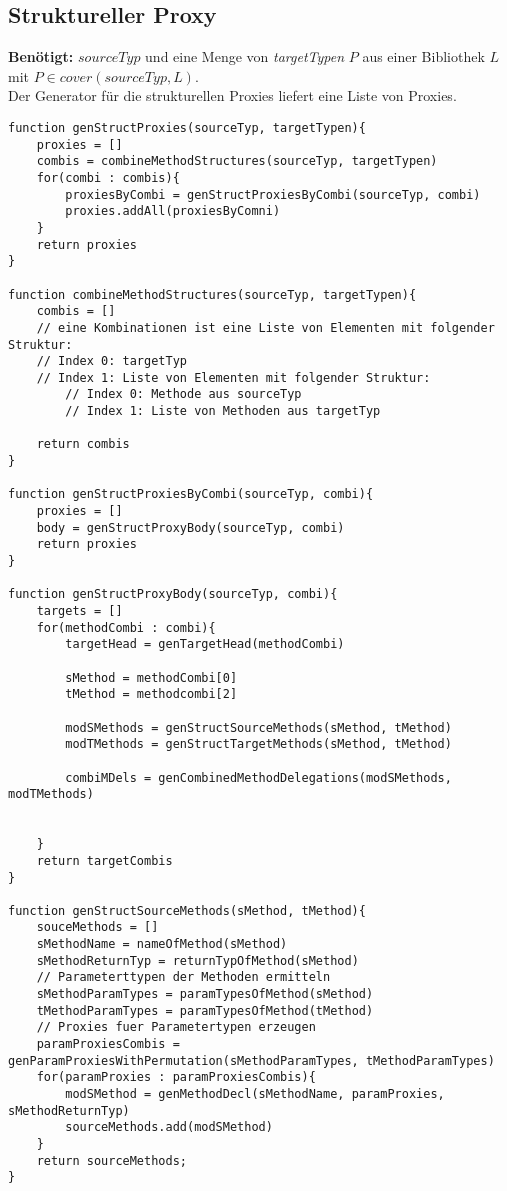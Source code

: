 \documentclass[a4paper,12pt]{article}
\begin{document}
\subsection{Struktureller Proxy}
\textbf{Benötigt: }$sourceTyp$ und eine Menge von \emph{targetTypen} $P$ aus einer Bibliothek $L$ mit $P \in \mathit{cover(sourceTyp, L)}$.\\
Der Generator für die strukturellen Proxies liefert eine Liste von Proxies.
\begin{lstlisting}[style = generator]
function genStructProxies(sourceTyp, targetTypen){
	proxies = []
	combis = combineMethodStructures(sourceTyp, targetTypen)
	for(combi : combis){
		proxiesByCombi = genStructProxiesByCombi(sourceTyp, combi)
		proxies.addAll(proxiesByComni)
	}
	return proxies
}

function combineMethodStructures(sourceTyp, targetTypen){
	combis = []
	// eine Kombinationen ist eine Liste von Elementen mit folgender Struktur:
	// Index 0: targetTyp
	// Index 1: Liste von Elementen mit folgender Struktur:
		// Index 0: Methode aus sourceTyp
		// Index 1: Liste von Methoden aus targetTyp
	
	return combis
}

function genStructProxiesByCombi(sourceTyp, combi){
	proxies = []
	body = genStructProxyBody(sourceTyp, combi)
	return proxies
}

function genStructProxyBody(sourceTyp, combi){
	targets = []
	for(methodCombi : combi){
		targetHead = genTargetHead(methodCombi)

		sMethod = methodCombi[0]
		tMethod = methodcombi[2]
		
		modSMethods = genStructSourceMethods(sMethod, tMethod)
		modTMethods = genStructTargetMethods(sMethod, tMethod)
		
		combiMDels = genCombinedMethodDelegations(modSMethods, modTMethods)
		
		
	}
	return targetCombis
}

function genStructSourceMethods(sMethod, tMethod){
	souceMethods = []
	sMethodName = nameOfMethod(sMethod)
	sMethodReturnTyp = returnTypOfMethod(sMethod)
	// Parameterttypen der Methoden ermitteln
	sMethodParamTypes = paramTypesOfMethod(sMethod)
	tMethodParamTypes = paramTypesOfMethod(tMethod)	
	// Proxies fuer Parametertypen erzeugen
	paramProxiesCombis = genParamProxiesWithPermutation(sMethodParamTypes, tMethodParamTypes)
	for(paramProxies : paramProxiesCombis){
		modSMethod = genMethodDecl(sMethodName, paramProxies, sMethodReturnTyp)	
		sourceMethods.add(modSMethod)	
	}
	return sourceMethods;
}


\end{lstlisting}
\end{document}
